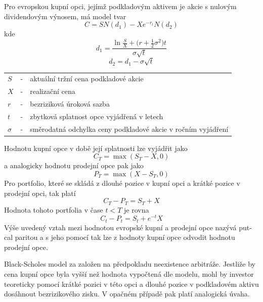 \documentclass[a4paper]{book}
\begin{document}
Pro evropskou kupní opci, jejímž podkladovým aktivem je akcie s nulovým dividendovým výnosem, má model tvar
\begin{equation*}
C = S N(d_1) - X e^{-r_t} N(d_2)
\end{equation*}
kde
\begin{equation*}
d_1 = \frac{\ln \frac{S}{X} + \big(r + \frac{1}{2}\sigma^2 \big)t}{\sigma \sqrt{t}}
\end{equation*}
\begin{equation*}
d_2 = d_1 - \sigma \sqrt{t}
\end{equation*}
\begin{center}
\begin{tabular}{ l c l}
$S$ & - & aktuální tržní cena podkladové akcie\\
$X$ & - & realizační cena\\
$r$ & - & bezriziková úroková sazba\\
$t$ & - & zbytková splatnost opce vyjádřená v letech\\
$\sigma$ & - & směrodatná odchylka ceny podkladové akcie v ročním vyjádření
\end{tabular}
\end{center}
Hodnotu kupní opce v době její splatnosti lze vyjádřit jako
\begin{equation*}
C_T = \max(S_T - X, 0)
\end{equation*}
a analogicky hodnotu prodejní opce pak jako
\begin{equation*}
P_T = \max(X - S_T, 0)
\end{equation*}
Pro portfolio, které se skládá z dlouhé pozice v kupní opci a krátké pozice v prodejní opci, tak platí
\begin{equation*}
C_T - P_T = S_T + X
\end{equation*}
Hodnota tohoto portfolia v čase $t < T$ je rovna
\begin{equation*}
C_t - P_t = S_t + e^{-t}X
\end{equation*}
Výše uvedený vztah mezi hodnotou evropské kupní a prodejní opce nazývá put-cal paritou a s jeho pomocí tak lze z hodnoty kupní opce odvodit hodnotu prodejní opce.

Black-Scholes model za založen na předpokladu neexistence arbitráže. Jestliže by cena kupní opce byla vyšší než hodnota vypočtená dle modelu, mohl by investor teoreticky pomocí krátké pozici v této opci a dlouhé pozice v podkladovém aktivu dosáhnout bezrizikového zisku. V opačném případě pak platí analogická úvaha.
\end{document}
